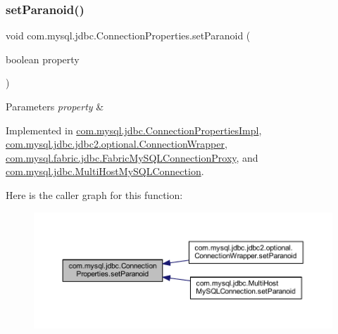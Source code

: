\subsubsection{\texorpdfstring{set\+Paranoid()}{setParanoid()}}
{\footnotesize\ttfamily void com.\+mysql.\+jdbc.\+Connection\+Properties.\+set\+Paranoid (\begin{DoxyParamCaption}\item[{boolean}]{property }\end{DoxyParamCaption})}


\begin{DoxyParams}{Parameters}
{\em property} & \\
\hline
\end{DoxyParams}


Implemented in \mbox{\hyperlink{classcom_1_1mysql_1_1jdbc_1_1_connection_properties_impl_af536d960a0f2d5e48f7b005ba212f8d7}{com.\+mysql.\+jdbc.\+Connection\+Properties\+Impl}}, \mbox{\hyperlink{classcom_1_1mysql_1_1jdbc_1_1jdbc2_1_1optional_1_1_connection_wrapper_a246bc6ed913e7b8cf4950a88744c3d04}{com.\+mysql.\+jdbc.\+jdbc2.\+optional.\+Connection\+Wrapper}}, \mbox{\hyperlink{classcom_1_1mysql_1_1fabric_1_1jdbc_1_1_fabric_my_s_q_l_connection_proxy_a811692b6ec5b6251faaf8e6a1f5b5d08}{com.\+mysql.\+fabric.\+jdbc.\+Fabric\+My\+S\+Q\+L\+Connection\+Proxy}}, and \mbox{\hyperlink{classcom_1_1mysql_1_1jdbc_1_1_multi_host_my_s_q_l_connection_a90febab2aa995ba6ef06ebaf57ffd087}{com.\+mysql.\+jdbc.\+Multi\+Host\+My\+S\+Q\+L\+Connection}}.

Here is the caller graph for this function\+:\nopagebreak
\begin{figure}[H]
\begin{center}
\leavevmode
\includegraphics[width=350pt]{interfacecom_1_1mysql_1_1jdbc_1_1_connection_properties_a01cf4f506ad942b96a36708c33221a48_icgraph}
\end{center}
\end{figure}
\mbox{\label{interfacecom_1_1mysql_1_1jdbc_1_1_connection_properties_acc7191665477c54523bc25845278b99f}} 
